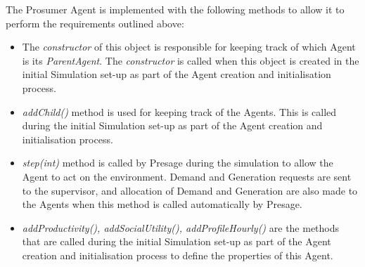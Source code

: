 The Prosumer Agent is implemented with the following methods to allow it to perform the requirements outlined above:
\begin{itemize}
	\item The \textit{constructor} of this object is responsible for keeping track of which Agent is its \textit{ParentAgent}. The \textit{constructor} is called when this object is created in the initial Simulation set-up as part of the Agent creation and initialisation process.
	\item \textit{addChild()} method is used for keeping track of the Agents. This is called during the initial Simulation set-up as part of the Agent creation and initialisation process.
	\item \textit{step(int)} method is called by Presage during the simulation to allow the Agent to act on the environment. Demand and Generation requests are sent to the supervisor, and allocation of Demand and Generation are also made to the Agents when this method is called automatically by Presage.
	\item \textit{addProductivity(), addSocialUtility(), addProfileHourly()} are the methods that are called during the initial Simulation set-up as part of the Agent creation and initialisation process to define the properties of this Agent.
\end{itemize}


